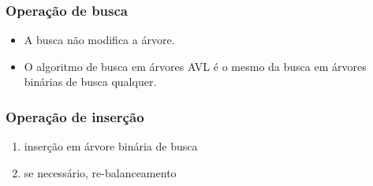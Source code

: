 \documentclass{beamer}
\begin{document}
\begin{frame}

\frametitle{Operação de busca}

\begin{itemize}
\item A busca não modifica a árvore.

\item O algoritmo de busca em árvores AVL é o mesmo da busca em árvores binárias
  de busca qualquer.

\end{itemize}
\end{frame}

\begin{frame}

\frametitle{Operação de inserção}

\begin{enumerate}

\item inserção em árvore binária de busca

\item \alert{se necessário}, re-balanceamento

\end{enumerate}

\end{frame}
\end{document}
